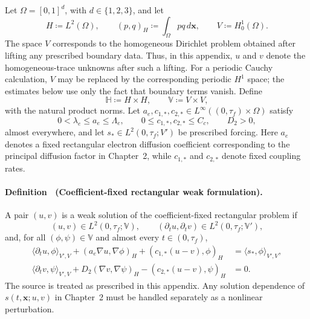 Let \(\Omega=[0,1]^d\), with \(d\in\{1,2,3\}\), and let
\[
    H\coloneqq L^2(\Omega),
    \qquad
    (p,q)_H\coloneqq\int_{\Omega}p q\,d\mathbf{x},
    \qquad
    V\coloneqq H^1_0(\Omega).
\]
The space \(V\) corresponds to the homogeneous Dirichlet problem obtained after lifting any prescribed boundary data. Thus, in this appendix, \(u\) and \(v\) denote the homogeneous-trace unknowns after such a lifting. For a periodic Cauchy calculation, \(V\) may be replaced by the corresponding periodic \(H^1\) space; the estimates below use only the fact that boundary terms vanish. Define
\[
    \mathbb{H}\coloneqq H\times H,
    \qquad
    \mathbb{V}\coloneqq V\times V,
\]
with the natural product norms. Let \(a_e,c_{1,*},c_{2,*}\in L^{\infty}((0,\tau_f)\times\Omega)\) satisfy
\[
    0<\lambda_e\le a_e\le\Lambda_e,
    \qquad
    0\le c_{1,*},c_{2,*}\le C_c,
    \qquad
    D_2>0,
\]
almost everywhere, and let \(s_*\in L^2(0,\tau_f;V')\) be prescribed forcing. Here \(a_e\) denotes a fixed rectangular electron diffusion coefficient corresponding to the principal diffusion factor in Chapter~2, while \(c_{1,*}\) and \(c_{2,*}\) denote fixed coupling rates.

\paragraph{Definition \thetheorem\ (Coefficient-fixed rectangular weak formulation).}\label{def:app-ch2-rectangular-weak-form}
A pair \((u,v)\) is a weak solution of the coefficient-fixed rectangular problem if
\[
    (u,v)\in L^2(0,\tau_f;\mathbb{V}),
    \qquad
    (\partial_tu,\partial_tv)\in L^2(0,\tau_f;\mathbb{V}'),
\]
and, for all \((\phi,\psi)\in\mathbb{V}\) and almost every \(t\in(0,\tau_f)\),
\begin{align}
    \langle\partial_tu,\phi\rangle_{V',V}
    +
    (a_e\nabla u,\nabla\phi)_H
    +
    (c_{1,*}(u-v),\phi)_H
     & =
    \langle s_*,\phi\rangle_{V',V},
    \label{eq:app-ch2-rectangular-weak-u}
    \\
    \langle\partial_tv,\psi\rangle_{V',V}
    +
    D_2(\nabla v,\nabla\psi)_H
    -
    (c_{2,*}(u-v),\psi)_H
     & =
    0.
    \label{eq:app-ch2-rectangular-weak-v}
\end{align}
The source is treated as prescribed in this appendix. Any solution dependence of \(s(t,\mathbf{x};u,v)\) in Chapter~2 must be handled separately as a nonlinear perturbation.

